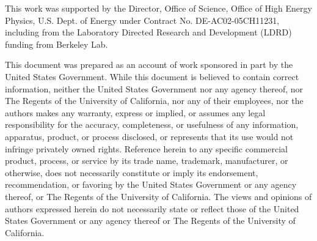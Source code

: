 \documentclass[a4paper]{article}   	%
\begin{document}
This work was supported by the Director, Office of Science, Office of High Energy Physics, U.S. Dept. of Energy under Contract No. DE-AC02-05CH11231, including from the Laboratory Directed Research and Development (LDRD) funding from Berkeley Lab.

This document was prepared as an account of work sponsored in part by the United States Government. While this document is believed to contain correct information, neither the United States Government nor any agency thereof, nor The Regents of the University of California, nor any of their employees, nor the authors makes any warranty, express or implied, or assumes any legal responsibility for the accuracy, completeness, or usefulness of any information, apparatus, product, or process disclosed, or represents that its use would not infringe privately owned rights. Reference herein to any specific commercial product, process, or service by its trade name, trademark, manufacturer, or otherwise, does not necessarily constitute or imply its endorsement, recommendation, or favoring by the United States Government or any agency thereof, or The Regents of the University of California. The views and opinions of authors expressed herein do not necessarily state or reflect those of the United States Government or any agency thereof or The Regents of the University of California.

\newpage
\appendix





\end{document}
